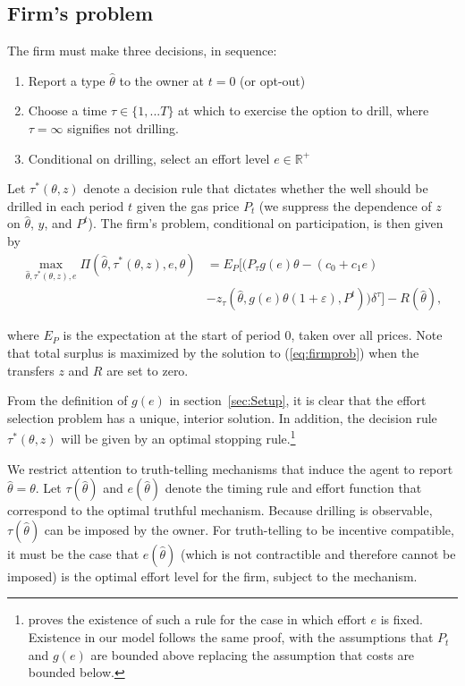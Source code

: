 \documentclass[12pt]{article}
\begin{document}
\subsection{Firm's problem \label{appx:FirmProb}}

The firm must make three decisions, in sequence:
\begin{enumerate}
\item Report a type $\hat{\theta}$ to the owner at $t=0$ (or opt-out)
\item Choose a time $\tau\in\{1,...T\}$ at which to exercise the option to drill, where $\tau=\infty$ signifies not drilling.
\item Conditional on drilling, select an effort level $e\in\mathbb{R}^+$
\end{enumerate}

Let $\tau^*(\theta,z)$ denote a decision rule that dictates whether the well should be drilled in each period $t$ given the gas price $P_t$ (we suppress the dependence of $z$ on $\hat{\theta}$, $y$, and $P^t$). The firm's problem, conditional on participation, is then given by
\begin{align}
\max_{\hat{\theta},\tau^*(\theta,z),e}\Pi(\hat{\theta},\tau^*(\theta,z),e,\theta)&=E_P[(P_\tau g(e)\theta-(c_0+c_1e) \nonumber \\
&-z_\tau(\hat{\theta},g(e)\theta(1+\varepsilon),P^t))\delta^\tau]-R(\hat{\theta}), \label{eq:firmprob}
\end{align}

where $E_P$ is the expectation at the start of period 0, taken over all prices. Note that total surplus is maximized by the solution to (\ref{eq:firmprob}) when the transfers $z$ and $R$ are set to zero.

From the definition of $g(e)$ in section~\ref{sec:Setup}, it is clear that the effort selection problem has a unique, interior solution. In addition, the decision rule $\tau^*(\theta,z)$ will be given by an optimal stopping rule.\footnote{\citet{bib:board} proves the existence of such a rule for the case in which effort $e$ is fixed. Existence in our model follows the same proof, with the assumptions that $P_t$ and $g(e)$ are bounded above replacing the \citet{bib:board} assumption that costs are bounded below.}

We restrict attention to truth-telling mechanisms that induce the agent to report $\hat{\theta}=\theta$. Let $\tau(\hat{\theta})$ and $e(\hat{\theta})$ denote the timing rule and effort function that correspond to the optimal truthful mechanism. Because drilling is observable, $\tau(\hat{\theta})$ can be imposed by the owner. For truth-telling to be incentive compatible, it must be the case that $e(\hat{\theta})$ (which is not contractible and therefore cannot be imposed) is the optimal effort level for the firm, subject to the mechanism.
\end{document}
